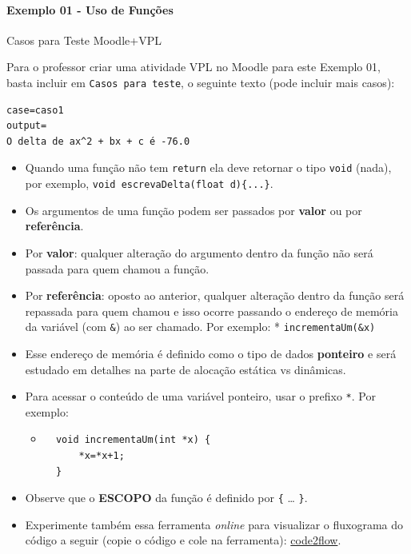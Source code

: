 \documentclass[12pt,a4paper]{article}
\begin{document}
    \hypertarget{exemplo-01---uso-de-funuxe7uxf5es}{%
\paragraph{Exemplo 01 - Uso de
Funções}\label{exemplo-01---uso-de-funuxe7uxf5es}}

    Casos para Teste Moodle+VPL

Para o professor criar uma atividade VPL no Moodle para este Exemplo 01,
basta incluir em \texttt{Casos\ para\ teste}, o seguinte texto (pode
incluir mais casos):

\begin{verbatim}
case=caso1
output= 
O delta de ax^2 + bx + c é -76.0
\end{verbatim}

    \begin{itemize}
\item
  Quando uma função não tem \texttt{return} ela deve retornar o tipo
  \texttt{void} (nada), por exemplo,
  \texttt{void\ escrevaDelta(float\ d)\{...\}}.
\item
  Os argumentos de uma função podem ser passados por \textbf{valor} ou
  por \textbf{referência}.
\item
  Por \textbf{valor}: qualquer alteração do argumento dentro da função
  não será passada para quem chamou a função.
\item
  Por \textbf{referência}: oposto ao anterior, qualquer alteração dentro
  da função será repassada para quem chamou e isso ocorre passando o
  endereço de memória da variável (com \texttt{\&}) ao ser chamado. Por
  exemplo: * \texttt{incrementaUm(\&x)}
\item
  Esse endereço de memória é definido como o tipo de dados
  \textbf{ponteiro} e será estudado em detalhes na parte de alocação
  estática vs dinâmicas.
\item
  Para acessar o conteúdo de uma variável ponteiro, usar o prefixo
  \texttt{*}. Por exemplo:

  \begin{itemize}
  \item
\begin{verbatim}
  void incrementaUm(int *x) {
      *x=*x+1;
  }
\end{verbatim}
  \end{itemize}
\item
  Observe que o \textbf{ESCOPO} da função é definido por \texttt{\{}
  \ldots{} \texttt{\}}.
\item
  Experimente também essa ferramenta \emph{online} para visualizar o
  fluxograma do código a seguir (copie o código e cole na ferramenta):
  \href{https://app.code2flow.com/}{code2flow}.
\end{itemize}
\end{document}
